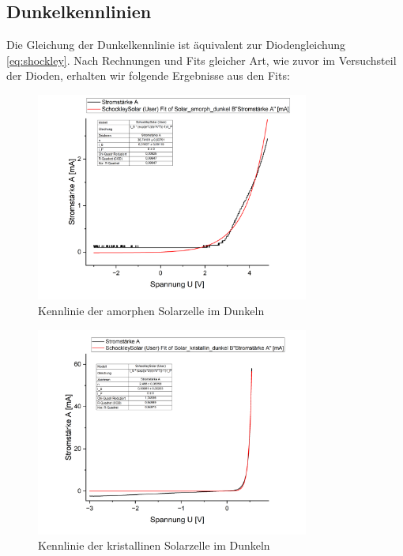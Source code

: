 \documentclass[12pt,a4paper,ngerman]{report}
\begin{document}
		\subsection{Dunkelkennlinien}

		Die Gleichung der Dunkelkennlinie ist äquivalent zur Diodengleichung \ref{eq:shockley}. Nach Rechnungen und Fits gleicher Art, wie zuvor im Versuchsteil der Dioden, erhalten wir folgende Ergebnisse aus den Fits:

		\begin{figure}
			\centering
			\includegraphics[width=0.8\textwidth]{Origin/Solar_amorph_dunkel.png}
			\caption{Kennlinie der amorphen Solarzelle im Dunkeln}
			\label{fig:SolarAmorphDunkel}
		\end{figure}

		\begin{figure}
			\centering
			\includegraphics[width=0.8\textwidth]{Origin/Solar_kristallin_dunkel.png}
			\caption{Kennlinie der kristallinen Solarzelle im Dunkeln}
			\label{fig:SolarKristallinDunkel}
		\end{figure}
\end{document}

